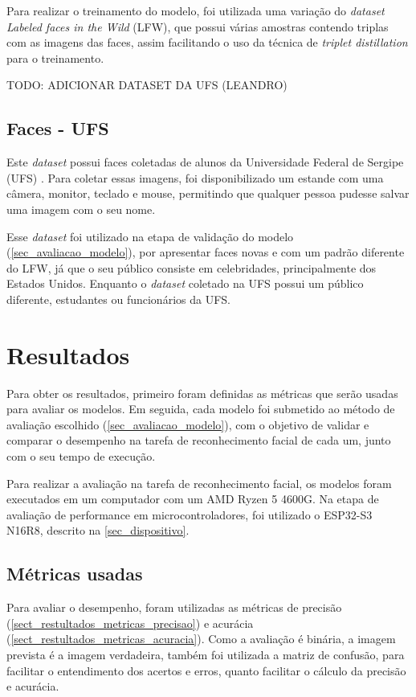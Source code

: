 Para realizar o treinamento do modelo, foi utilizada uma variação do \textit{dataset}
\textit{Labeled faces in the Wild} (LFW), que possui várias amostras contendo triplas com as imagens das faces,
assim facilitando o uso da técnica de \textit{triplet distillation} para o treinamento.

TODO: ADICIONAR DATASET DA UFS (LEANDRO)
\subsection{Faces - UFS}\label{subsec_dataset_faces_ufs}
Este \textit{dataset} possui faces coletadas de alunos da Universidade Federal de Sergipe (UFS) \cite{leandro}.
Para coletar essas imagens, foi disponibilizado um estande com uma câmera, monitor, teclado e mouse, permitindo
que qualquer pessoa pudesse salvar uma imagem com o seu nome.

Esse \textit{dataset} foi utilizado na etapa de validação do modelo (\ref{sec_avaliacao_modelo}), por apresentar faces
novas e com um padrão diferente do LFW, já que o seu público consiste em celebridades, principalmente dos Estados
Unidos. Enquanto o \textit{dataset} coletado na UFS possui um público diferente, estudantes ou funcionários da UFS.

\section{Resultados}\label{sec_resultados}
Para obter os resultados, primeiro foram definidas as métricas que serão usadas para avaliar os modelos. Em seguida,
cada modelo foi submetido ao método de avaliação escolhido (\autoref{sec_avaliacao_modelo}), com o objetivo de
validar e comparar o desempenho na tarefa de reconhecimento facial de cada um, junto com o seu tempo de execução.

Para realizar a avaliação na tarefa de reconhecimento facial, os modelos foram executados em um computador com um
AMD Ryzen 5 4600G. Na etapa de avaliação de performance em microcontroladores, foi utilizado o ESP32-S3 N16R8,
descrito na \autoref{sec_dispositivo}.

\subsection{Métricas usadas}\label{sect_restultados_metricas}
Para avaliar o desempenho, foram utilizadas as métricas de precisão (\ref{sect_restultados_metricas_precisao})
e acurácia (\ref{sect_restultados_metricas_acuracia}). Como a avaliação é binária, a imagem prevista é a imagem
verdadeira, também foi utilizada a matriz de confusão, para facilitar o entendimento dos acertos e erros, quanto
facilitar o cálculo da precisão e acurácia.

